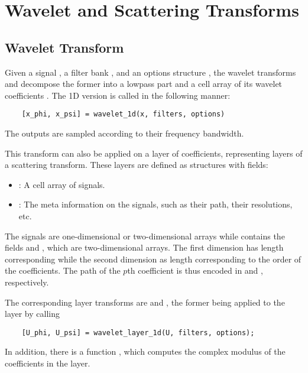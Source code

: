 \documentclass[twocolumn]{article}
\begin{document}
\section{Wavelet and Scattering Transforms}

\subsection{Wavelet Transform}

Given a signal , a filter bank , and an options structure , the wavelet transforms  and  decompose the former into a lowpass part  and a cell array of its wavelet coefficients . The 1D version is called in the following manner:
\begin{lstlisting}
	[x_phi, x_psi] = wavelet_1d(x, filters, options)
\end{lstlisting}
The outputs are sampled according to their frequency bandwidth.

This transform can also be applied on a layer of coefficients, representing layers of a scattering transform. These layers are defined as structures with fields:
\begin{itemize}
	\item {}: A cell array of signals.
	\item {}: The meta information on the signals, such as their path, their resolutions, etc.
\end{itemize}
The signals are one-dimensional or two-dimensional arrays while  contains the fields  and , which are two-dimensional arrays. The first dimension has length corresponding  while the second dimension as length corresponding to the order of the coefficients. The path of the $p$th coefficient is thus encoded in  and , respectively.

The corresponding layer transforms are  and , the former being applied to the layer  by calling
\begin{lstlisting}
	[U_phi, U_psi] = wavelet_layer_1d(U, filters, options);
\end{lstlisting}

In addition, there is a function , which computes the complex modulus of the coefficients in the layer.
\end{document}
